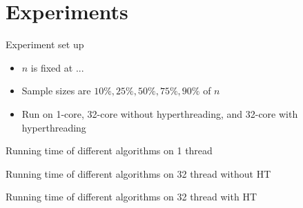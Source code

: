 \section{Experiments}

\begin{frame}{Experiment set up}
  \begin{itemize}
    \item \(n\) is fixed at ...
    \item Sample sizes are \(10\%, 25\%, 50\%, 75\%, 90\%\) of \(n\)
    \item Run on 1-core, 32-core without hyperthreading, and 32-core with hyperthreading
  \end{itemize}
\end{frame}

\begin{frame}{Running time of different algorithms on 1 thread}
\end{frame}

\begin{frame}{Running time of different algorithms on 32 thread without HT}
\end{frame}

\begin{frame}{Running time of different algorithms on 32 thread with HT}
\end{frame}
